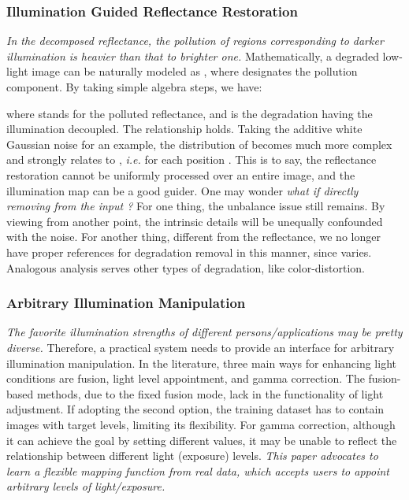 \documentclass[journal,10pt,compsoc]{IEEEtran}
\begin{document}
\subsubsection{Illumination Guided Reflectance Restoration}
{\it In the decomposed reflectance, the pollution of regions corresponding to darker illumination is heavier than that to brighter one.} Mathematically, a degraded low-light image can be naturally modeled as , where  designates the pollution component. By taking simple algebra steps, we have:

where  stands for the polluted reflectance, and   is the degradation having the illumination decoupled. The relationship  holds. Taking the additive white Gaussian noise  for an example, the distribution of  becomes much more complex and strongly relates to , {\it i.e.}  for each position . This is to say, the reflectance restoration cannot be uniformly processed over an entire image, and the illumination map can be a good guider. One may wonder {\it what if directly removing  from the input ?} For one thing, the unbalance issue still remains. By viewing from another point, the intrinsic details will be unequally confounded with the noise. For another thing, different from the reflectance, we no longer have proper references for degradation removal in this manner, since  varies. Analogous analysis serves other types of degradation, like color-distortion. 



\subsubsection{Arbitrary Illumination Manipulation}
{\it The favorite illumination strengths of different persons/applications may be pretty diverse.} Therefore, a practical system needs to provide an interface for arbitrary illumination manipulation. In the literature, three main ways for enhancing light conditions are fusion, light level appointment, and gamma correction. The fusion-based methods, due to the fixed fusion mode, lack in the functionality of light adjustment. If adopting the second option, the training dataset has to contain images with target levels, limiting its flexibility. For gamma correction, although it can achieve the goal by setting different  values, it may be unable to reflect the relationship between different light (exposure) levels. {\it This paper advocates to learn a flexible mapping function from real data, which accepts users to appoint arbitrary levels of light/exposure.} 
\end{document}
